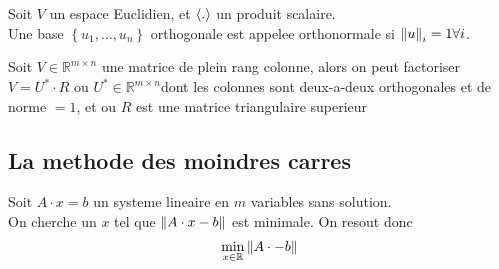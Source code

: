 \documentclass[../main.tex]{subfiles}
\begin{document}
\begin{defn}
	Soit $V$ un espace Euclidien, et $\left\langle.\right\rangle$ un produit scalaire.\\
	Une base $ \left\{ u_1,\ldots, u_n \right\} $ orthogonale  est appelee orthonormale si  $\left\lVert u\right\rVert_i= 1 \forall i$.\\


\end{defn}
\begin{crly}
Soit $V\in \mathbb{R}^{m\times n}$ une matrice de plein rang colonne, alors on peut factoriser $V= U^{*}\cdot R$ ou $U^{*} \in \mathbb{R}^{m\times n}$dont les colonnes sont deux-a-deux orthogonales et de norme $=1$, et ou $R$ est une matrice triangulaire superieur
\end{crly}
\subsection{La methode des moindres carres}
Soit $A\cdot x = b$ un systeme lineaire en $m$ variables sans solution.\\
On cherche un $x$ tel que $\left\lVert A\cdot x - b\right\rVert $ est minimale.
On resout donc
\[ 
\min_{x \in \mathbb{R}} \left\lVert A\cdot -b\right\rVert 
\]
\end{document}

